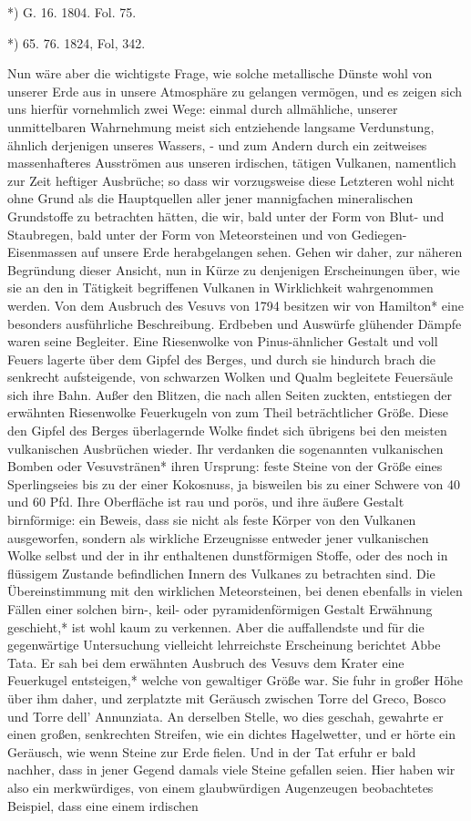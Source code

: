 \documentclass[a4paper, 8pt, oneside, polutonikogreek, german]{article}
\begin{document}
*) G. 16. 1804. Fol. 75.

*) 65. 76. 1824, Fol, 342.

Nun wäre aber die wichtigste Frage, wie solche metallische Dünste wohl von unserer Erde aus in unsere Atmosphäre zu gelangen vermögen, und es zeigen sich uns hierfür vornehmlich zwei Wege: einmal durch allmähliche, unserer unmittelbaren Wahrnehmung meist sich entziehende langsame Verdunstung, ähnlich derjenigen unseres Wassers, - und zum Andern durch ein zeitweises massenhafteres Ausströmen aus unseren irdischen, tätigen Vulkanen, namentlich zur Zeit heftiger Ausbrüche; so dass wir vorzugsweise diese Letzteren wohl nicht ohne Grund als die Hauptquellen aller jener mannigfachen mineralischen Grundstoffe zu betrachten hätten, die wir, bald unter der Form von Blut- und Staubregen, bald unter der Form von Meteorsteinen und von Gediegen-Eisenmassen auf unsere Erde herabgelangen sehen. Gehen wir daher, zur näheren Begründung dieser Ansicht, nun in Kürze zu denjenigen Erscheinungen über, wie sie an den in Tätigkeit begriffenen Vulkanen in Wirklichkeit wahrgenommen werden. Von dem Ausbruch des Vesuvs von 1794 besitzen wir von Hamilton* eine besonders ausführliche Beschreibung. Erdbeben und Auswürfe glühender Dämpfe waren seine Begleiter. Eine Riesenwolke von Pinus-ähnlicher Gestalt und voll Feuers lagerte über dem Gipfel des Berges, und durch sie hindurch brach die senkrecht aufsteigende, von schwarzen Wolken und Qualm begleitete Feuersäule sich ihre Bahn. Außer den Blitzen, die nach allen Seiten zuckten, entstiegen der erwähnten Riesenwolke Feuerkugeln von zum Theil beträchtlicher Größe. Diese den Gipfel des Berges überlagernde Wolke findet sich übrigens bei den meisten vulkanischen Ausbrüchen wieder. Ihr verdanken die sogenannten vulkanischen Bomben oder Vesuvstränen* ihren Ursprung: feste Steine von der Größe eines Sperlingseies bis zu der einer Kokosnuss, ja bisweilen bis zu einer Schwere von 40 und 60 Pfd. Ihre Oberfläche ist rau und porös, und ihre äußere Gestalt birnförmige: ein Beweis, dass sie nicht als feste Körper von den Vulkanen ausgeworfen, sondern als wirkliche Erzeugnisse entweder jener vulkanischen Wolke selbst und der in ihr enthaltenen dunstförmigen Stoffe, oder des noch in flüssigem Zustande befindlichen Innern des Vulkanes zu betrachten sind. Die Übereinstimmung mit den wirklichen Meteorsteinen, bei denen ebenfalls in vielen Fällen einer solchen birn-, keil- oder pyramidenförmigen Gestalt Erwähnung geschieht,* ist wohl kaum zu verkennen. Aber die auffallendste und für die gegenwärtige Untersuchung vielleicht lehrreichste Erscheinung berichtet Abbe Tata. Er sah bei dem erwähnten Ausbruch des Vesuvs dem Krater eine Feuerkugel entsteigen,* welche von gewaltiger Größe war. Sie fuhr in großer Höhe über ihm daher, und zerplatzte mit Geräusch zwischen Torre del Greco, Bosco und Torre dell' Annunziata. An derselben Stelle, wo dies geschah, gewahrte er einen großen, senkrechten Streifen, wie ein dichtes Hagelwetter, und er hörte ein Geräusch, wie wenn Steine zur Erde fielen. Und in der Tat erfuhr er bald nachher, dass in jener Gegend damals viele Steine gefallen seien. Hier haben wir also ein merkwürdiges, von einem glaubwürdigen Augenzeugen beobachtetes Beispiel, dass eine einem irdischen 
\end{document}
